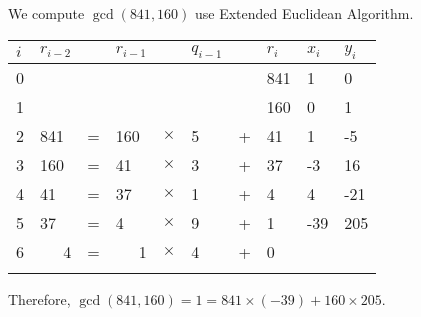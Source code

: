 \begin{eg}
  We compute $\gcd(841, 160)$ use Extended Euclidean Algorithm.
\begin{table}[!ht]
\centering
\begin{tabular}{llllllllll}
$i$ & $r_{i-2}$            &   & $r_{i-1}$            &          & $q_{i-1}$ &   & $r_i$ & $x_i$ & $y_i$ \\ \hline
0 &                       &   &                       &          &            &   & 841  & 1    & 0    \\
1 &                       &   &                       &          &            &   & 160  & 0    & 1    \\
2 & 841                   & = & 160                   & $\times$ & 5          & + & 41   & 1    & -5   \\
3 & 160                   & = & 41                    & $\times$ & 3          & + & 37   & -3   & 16   \\
4 & 41                    & = & 37                    & $\times$ & 1          & + & 4    & 4    & -21  \\
5 & 37                    & = & 4                     & $\times$ & 9          & + & 1    & -39  & 205  \\
6 & \multicolumn{1}{r}{4} & = & \multicolumn{1}{r}{1} & $\times$ & 4          & + & 0    &      &      \\
  & \multicolumn{1}{r}{}  &   &                       &          &            &   &      &      &
\end{tabular}%
\end{table}

Therefore, $\gcd(841, 160) = 1 = 841 \times (-39) + 160 \times 205$.
\end{eg}
